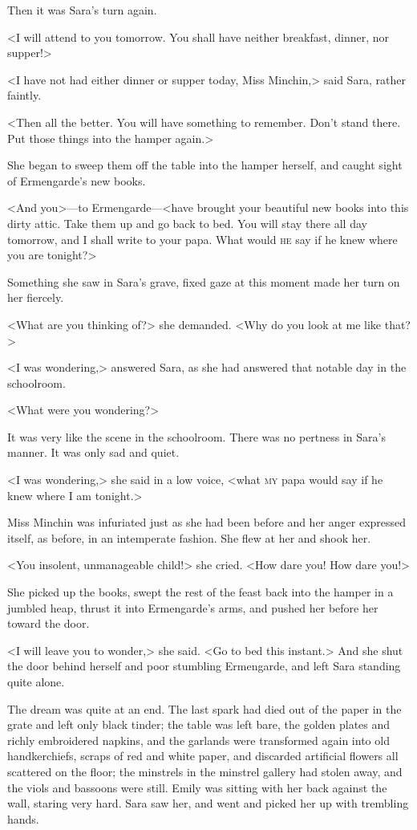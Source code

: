 Then it was Sara's turn again.

<I will attend to you tomorrow. You shall have neither breakfast, dinner, nor supper!>

<I have not had either dinner or supper today, Miss Minchin,> said Sara, rather faintly.

<Then all the better. You will have something to remember. Don't stand there. Put those things into the hamper again.>

She began to sweep them off the table into the hamper herself, and caught sight of Ermengarde's new books.

<And you>—to Ermengarde—<have brought your beautiful new books into this dirty attic. Take them up and go back to bed. You will stay there all day tomorrow, and I shall write to your papa. What would \textsc{he} say if he knew where you are tonight?>

Something she saw in Sara's grave, fixed gaze at this moment made her turn on her fiercely.

<What are you thinking of?> she demanded. <Why do you look at me like that?>

<I was wondering,> answered Sara, as she had answered that notable day in the schoolroom.

<What were you wondering?>

It was very like the scene in the schoolroom. There was no pertness in Sara's manner. It was only sad and quiet.

<I was wondering,> she said in a low voice, <what \textsc{my} papa would say if he knew where I am tonight.>

Miss Minchin was infuriated just as she had been before and her anger expressed itself, as before, in an intemperate fashion. She flew at her and shook her.

<You insolent, unmanageable child!> she cried. <How dare you! How dare you!>

She picked up the books, swept the rest of the feast back into the hamper in a jumbled heap, thrust it into Ermengarde's arms, and pushed her before her toward the door.

<I will leave you to wonder,> she said. <Go to bed this instant.> And she shut the door behind herself and poor stumbling Ermengarde, and left Sara standing quite alone.

The dream was quite at an end. The last spark had died out of the paper in the grate and left only black tinder; the table was left bare, the golden plates and richly embroidered napkins, and the garlands were transformed again into old handkerchiefs, scraps of red and white paper, and discarded artificial flowers all scattered on the floor; the minstrels in the minstrel gallery had stolen away, and the viols and bassoons were still. Emily was sitting with her back against the wall, staring very hard. Sara saw her, and went and picked her up with trembling hands.

